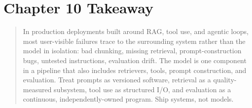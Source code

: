 \section{Chapter 10 Takeaway}

\begin{quote}
In production deployments built around RAG, tool use, and
agentic loops, most user-visible failures trace to the surrounding
system rather than the model in isolation: bad chunking, missing
retrieval, prompt-construction bugs, untested instructions,
evaluation drift. The model is one component in a pipeline that
also includes retrievers, tools, prompt construction, and
evaluation. Treat prompts as versioned software,
retrieval as a quality-measured subsystem, tool use as structured
I/O, and evaluation as a continuous, independently-owned program.
Ship systems, not models.
\end{quote}
